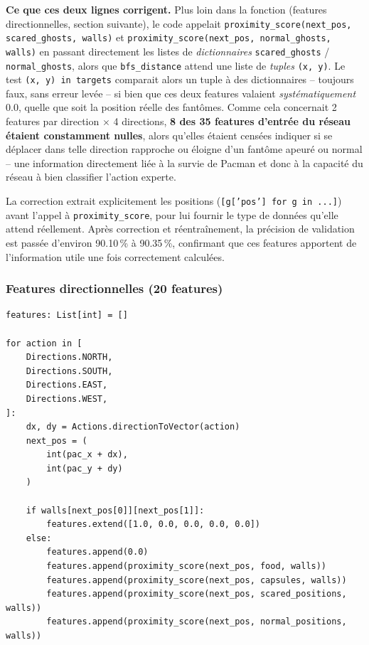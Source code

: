 \documentclass[a4paper,12pt]{article}
\begin{document}
\textbf{Ce que ces deux lignes corrigent.} Plus loin dans la fonction
(features directionnelles, section suivante), le code appelait
\texttt{proximity\_score(next\_pos, scared\_ghosts, walls)} et
\texttt{proximity\_score(next\_pos, normal\_ghosts, walls)} en passant
directement les listes de \emph{dictionnaires} \texttt{scared\_ghosts} /
\texttt{normal\_ghosts}, alors que \texttt{bfs\_distance} attend une
liste de \emph{tuples} \texttt{(x, y)}. Le test
\texttt{(x, y) in targets} comparait alors un tuple à des dictionnaires
-- toujours faux, sans erreur levée -- si bien que ces deux features
valaient \emph{systématiquement} 0.0, quelle que soit la position réelle
des fantômes. Comme cela concernait 2 features par direction $\times$ 4
directions, \textbf{8 des 35 features d'entrée du réseau étaient
constamment nulles}, alors qu'elles étaient censées indiquer si se
déplacer dans telle direction rapproche ou éloigne d'un fantôme apeuré ou
normal -- une information directement liée à la survie de Pacman et donc
à la capacité du réseau à bien classifier l'action experte.

La correction extrait explicitement les positions
(\texttt{[g['pos'] for g in ...]}) avant l'appel à
\texttt{proximity\_score}, pour lui fournir le type de données qu'elle
attend réellement. Après correction et réentraînement, la précision de
validation est passée d'environ 90.10\,\% à 90.35\,\%, confirmant que ces
features apportent de l'information utile une fois correctement calculées.

\subsubsection{Features directionnelles (20 features)}

\begin{lstlisting}
features: List[int] = []

for action in [
    Directions.NORTH,
    Directions.SOUTH,
    Directions.EAST,
    Directions.WEST,
]:
    dx, dy = Actions.directionToVector(action)
    next_pos = (
        int(pac_x + dx),
        int(pac_y + dy)
    )

    if walls[next_pos[0]][next_pos[1]]:
        features.extend([1.0, 0.0, 0.0, 0.0, 0.0])
    else:
        features.append(0.0)
        features.append(proximity_score(next_pos, food, walls))
        features.append(proximity_score(next_pos, capsules, walls))
        features.append(proximity_score(next_pos, scared_positions, walls))
        features.append(proximity_score(next_pos, normal_positions, walls))
\end{lstlisting}
\end{document}

